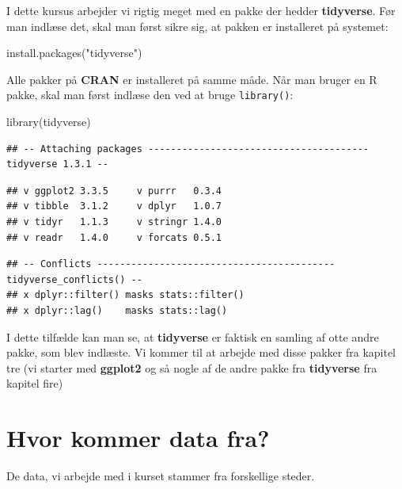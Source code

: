 \documentclass[
]{book}
\newenvironment{Shaded}{\begin{snugshade}}{\end{snugshade}}
\newcommand{\FunctionTok}[1]{\textcolor[rgb]{0.00,0.00,0.00}{#1}}
\newcommand{\NormalTok}[1]{#1}
\newcommand{\StringTok}[1]{\textcolor[rgb]{0.31,0.60,0.02}{#1}}
\begin{document}
I dette kursus arbejder vi rigtig meget med en pakke der hedder \textbf{tidyverse}. Før man indlæse det, skal man først sikre sig, at pakken er installeret på systemet:

\begin{Shaded}
\begin{Highlighting}[]
\FunctionTok{install.packages}\NormalTok{(}\StringTok{"tidyverse"}\NormalTok{)}
\end{Highlighting}
\end{Shaded}

Alle pakker på \textbf{CRAN} er installeret på samme måde. Når man bruger en R pakke, skal man først indlæse den ved at bruge \texttt{library()}:

\begin{Shaded}
\begin{Highlighting}[]
\FunctionTok{library}\NormalTok{(tidyverse)}
\end{Highlighting}
\end{Shaded}

\begin{verbatim}
## -- Attaching packages --------------------------------------- tidyverse 1.3.1 --
\end{verbatim}

\begin{verbatim}
## v ggplot2 3.3.5     v purrr   0.3.4
## v tibble  3.1.2     v dplyr   1.0.7
## v tidyr   1.1.3     v stringr 1.4.0
## v readr   1.4.0     v forcats 0.5.1
\end{verbatim}

\begin{verbatim}
## -- Conflicts ------------------------------------------ tidyverse_conflicts() --
## x dplyr::filter() masks stats::filter()
## x dplyr::lag()    masks stats::lag()
\end{verbatim}

I dette tilfælde kan man se, at \textbf{tidyverse} er faktisk en samling af otte andre pakke, som blev indlæste. Vi kommer til at arbejde med disse pakker fra kapitel tre (vi starter med \textbf{ggplot2} og så nogle af de andre pakke fra \textbf{tidyverse} fra kapitel fire)

\hypertarget{hvor-kommer-data-fra}{%
\section{Hvor kommer data fra?}\label{hvor-kommer-data-fra}}

De data, vi arbejde med i kurset stammer fra forskellige steder.
\end{document}

